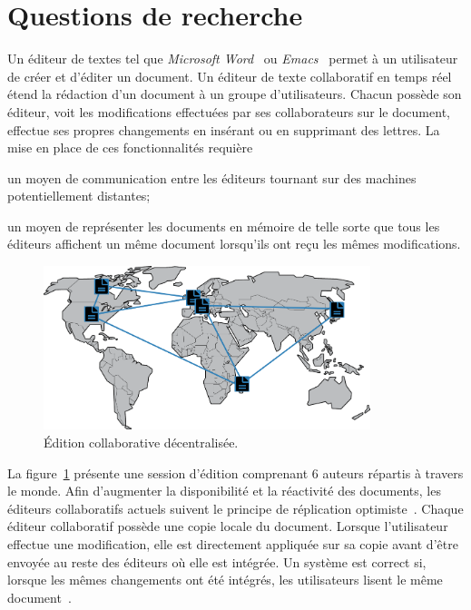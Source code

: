 
\section{Questions de recherche}

Un éditeur de textes tel que \emph{Microsoft Word}~\cite{word} ou
\emph{Emacs}~\cite{emacs} permet à un utilisateur de créer et d'éditer un
document. Un éditeur de texte collaboratif en temps
réel~\cite{ellis1991groupware} étend la rédaction d'un document à un groupe
d'utilisateurs. Chacun possède son éditeur, voit les modifications effectuées
par ses collaborateurs sur le document, effectue ses propres changements en
insérant ou en supprimant des lettres. La mise en place de ces fonctionnalités
requière
\begin{inparaenum}[(i)]
\item un moyen de communication entre les éditeurs tournant sur des machines
  potentiellement distantes;
\item un moyen de représenter les documents en mémoire de telle sorte que tous
  les éditeurs affichent un même document lorsqu'ils ont reçu les mêmes
  modifications.
\end{inparaenum}

\begin{figure}
  \begin{center}
    \includegraphics[width=0.85\textwidth]{img/world.png}
    \caption[Édition collaborative décentralisée]{\label{intro:img:world}Édition
      collaborative décentralisée.}
  \end{center}
\end{figure}

La figure~\ref{intro:img:world} présente une session d'édition comprenant 6
auteurs répartis à travers le monde. Afin d'augmenter la disponibilité et la
réactivité des documents, les éditeurs collaboratifs actuels suivent le principe
de réplication optimiste~\cite{saito2005optimistic}. Chaque éditeur collaboratif
possède une copie locale du document.  Lorsque l'utilisateur effectue une
modification, elle est directement appliquée sur sa copie avant d'être envoyée
au reste des éditeurs où elle est intégrée. Un système est correct si, lorsque
les mêmes changements ont été intégrés, les utilisateurs lisent le même
document~\cite{burckhardt2014replicated, shapiro2011conflict}.

